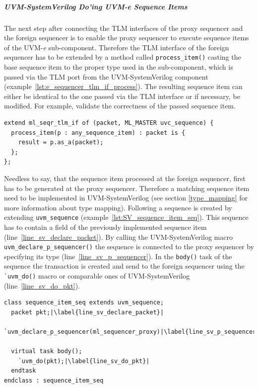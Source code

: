 \subparagraph{UVM-SystemVerilog Do'ing UVM-\textit{e} Sequence Items}
\lstset{language=e, numbers = left, escapechar=|, breaklines=true}
The next step after connecting the TLM interfaces of the proxy sequencer and the foreign sequencer is to enable the proxy sequencer to execute sequence items of the UVM-\textit{e} sub-component. Therefore the TLM interface of the foreign sequencer has to be extended by a method called \lstinline$process_item()$ casting the  base sequence item to the proper type used in the sub-component, which is passed via the TLM port from the UVM-SystemVerilog component (example~\ref{lst:e_sequencer_tlm_if_process}). The resulting sequence item can either be identical to the one passed via the TLM interface or if necessary, be modified. For example, validate the correctness of the passed sequence item.
\lstset{language=e, numbers = left, escapechar=|, breaklines=true}
\begin{lstlisting}[frame=htrbl, caption={\textit{e}: processing the sequence item send from the UVM-SystemVerilog component},
label={lst:e_sequencer_tlm_if_process}]
extend ml_seqr_tlm_if of (packet, ML_MASTER uvc_sequence) {
  process_item(p : any_sequence_item) : packet is {
    result = p.as_a(packet);
  };
};
\end{lstlisting}
Needless to say, that the sequence item processed at the foreign sequencer, first has to be generated at the proxy sequencer. Therefore a matching sequence item need to be implemented in UVM-SystemVerilog (see section \ref{type_mapping} for more information about type mapping). Following a sequence is created by extending \lstinline$uvm_sequence$ (example~\ref{lst:SV_sequence_item_seq}). This sequence has to contain a field of the previously implemented sequence item (line~\ref{line_sv_declare_packet}). By calling the UVM-SystemVerilog macro \lstinline$uvm_declare_p_sequencer()$ the sequence is connected to the proxy sequencer by specifying its type (line~\ref{line_sv_p_sequencer}). In the \lstinline$body()$ task of the sequence the transaction is created and send to the foreign sequencer using the \lstinline$`uvm_do()$ macro or comparable ones of UVM-SystemVerilog (line~\ref{line_sv_do_pkt}).
\lstset{language=SystemVerilog, numbers = left, escapechar=|, breaklines=true}
\begin{lstlisting}[frame=htrbl, caption={SystemVerilog: connecting proxy sequencer and foreign sequencer},
label={lst:SV_sequence_item_seq}]
class sequence_item_seq extends uvm_sequence;
  packet pkt;|\label{line_sv_declare_packet}|
  `uvm_declare_p_sequencer(ml_sequencer_proxy)|\label{line_sv_p_sequencer}|

  virtual task body();
    `uvm_do(pkt);|\label{line_sv_do_pkt}|
  endtask  
endclass : sequence_item_seq
\end{lstlisting}

